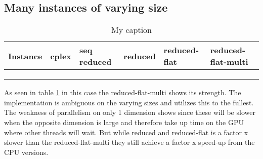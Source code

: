 \subsection{Many instances of varying size}
\begin{table}[H]
	\centering
	\caption{My caption}
	\label{table:many_varying_instances}
	\begin{tabular}{|l|l|l|l|l|l|}\hline
		Instance & cplex & seq reduced & reduced & reduced-flat & reduced-flat-multi \\\hline
		&       &             &         &              &                    \\\hline
		&       &             &         &              &                    \\\hline
		&       &             &         &              &                   \\\hline
	\end{tabular}
\end{table}


As seen in table \ref{table:many_varying_instances} in this case the reduced-flat-multi shows its strength. The implementation is ambiguous on the varying sizes and utilizes this to the fullest. The weakness of parallelism on only 1 dimension shows since these will be slower when the opposite dimension is large and therefore take up time on the GPU where other threads will wait. But while reduced and reduced-flat is a factor x slower than the reduced-flat-multi they still achieve a factor x speed-up from the CPU versions.
